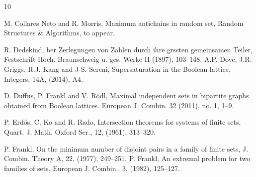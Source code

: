\documentclass[11pt]{article}
\numberwithin{equation}{section}
\begin{document}
\begin{thebibliography}{10}

 M. Collares Neto and R. Morris, Maximum antichains in random set, Random Structures \& Algorithms, to appear.

 R. Dedekind, ber Zerlegungen von Zahlen durch ihre grssten gemeinsamen Teiler, Festschrift Hoch. Braunschweig u. ges. Werke II (1897), 103--148.
 A.P. Dove, J.R. Griggs, R.J. Kang and J-S. Sereni, Supersaturation in the Boolean lattice,
Integers, 14A, (2014), A4.



 D. Duffus, P. Frankl and V. R\"{o}dl,  Maximal independent sets in bipartite graphs obtained from Boolean lattices. European J. Combin. 32 (2011), no. 1, 1--9.



 P. Erd\H{o}s, C. Ko and R. Rado,
Intersection theorems for systems of finite sets, Quart. J. Math. Oxford Ser.,  12,
(1961), 313--320.

 P. Frankl,
On the minimum number of disjoint pairs in a family of finite sets,
J. Combin. Theory A,
22,
(1977), 249--251.
 P. Frankl, An extremal problem for two families of sets, European J. Combin., 3, (1982), 125--127.



\end{thebibliography}
\end{document}
